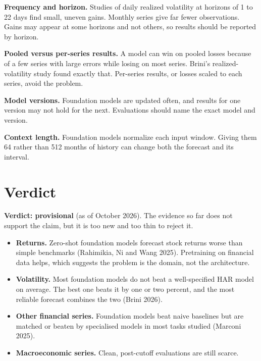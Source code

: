 \textbf{Frequency and horizon.} Studies of daily realized volatility at horizons of 1 to 22 days find small, uneven gains. Monthly series give far fewer observations. Gains may appear at some horizons and not others, so results should be reported by horizon.

\textbf{Pooled versus per-series results.} A model can win on pooled losses because of a few series with large errors while losing on most series. Brini's realized-volatility study found exactly that. Per-series results, or losses scaled to each series, avoid the problem.

\textbf{Model versions.} Foundation models are updated often, and results for one version may not hold for the next. Evaluations should name the exact model and version.

\textbf{Context length.} Foundation models normalize each input window. Giving them 64 rather than 512 months of history can change both the forecast and its interval.

\section{Verdict}
\label{sec:21-verdict}

\begin{callout}
\textbf{Verdict: provisional} (as of October 2026). The evidence so far does not support the claim, but it is too new and too thin to reject it.
\end{callout}

\begin{itemize}
  \item \textbf{Returns.} Zero-shot foundation models forecast stock returns worse than simple benchmarks (Rahimikia, Ni and Wang 2025). Pretraining on financial data helps, which suggests the problem is the domain, not the architecture.
  \item \textbf{Volatility.} Most foundation models do not beat a well-specified HAR model on average. The best one beats it by one or two percent, and the most reliable forecast combines the two (Brini 2026).
  \item \textbf{Other financial series.} Foundation models beat naive baselines but are matched or beaten by specialised models in most tasks studied (Marconi 2025).
  \item \textbf{Macroeconomic series.} Clean, post-cutoff evaluations are still scarce.
\end{itemize}

